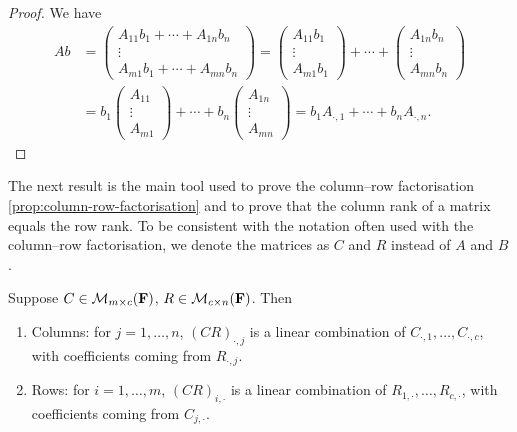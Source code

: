 \begin{proof}
We have
\begin{align*}
Ab&=\begin{pmatrix}
A_{11}b_1+\cdots+A_{1n}b_n\\
\vdots\\
A_{m1}b_1+\cdots+A_{mn}b_n
\end{pmatrix}
=\begin{pmatrix}
A_{11}b_1\\\vdots\\A_{m1}b_1
\end{pmatrix}+\cdots+\begin{pmatrix}
A_{1n}b_n\\\vdots\\A_{mn}b_n
\end{pmatrix}\\
&=b_1\begin{pmatrix}
A_{11}\\\vdots\\A_{m1}
\end{pmatrix}+\cdots+b_n\begin{pmatrix}
A_{1n}\\\vdots\\A_{mn}
\end{pmatrix}
=b_1A_{\cdot,1}+\cdots+b_nA_{\cdot,n}.
\end{align*}
\end{proof}

The next result is the main tool used to prove the column--row factorisation \ref{prop:column-row-factorisation} and to prove that the column rank of a matrix equals the row rank. 
To be consistent with the notation often used with the column--row factorisation, we denote the matrices as $C$ and $R$ instead of $A$ and $B$.

\begin{lemma}\label{lemma:matrix-multiplication-linear combinations-of-columns-or-rows}
Suppose $C\in\mathcal{M}_{m\times c}(\mathbf F)$, $R\in\mathcal{M}_{c\times n}(\mathbf F)$. Then
\begin{enumerate}[label=(\roman*)]
\item Columns: for $j=1,\dots,n$, $(CR)_{\cdot,j}$ is a linear combination of $C_{\cdot,1},\dots,C_{\cdot,c}$, with coefficients coming from $R_{\cdot,j}$.
\item Rows: for $i=1,\dots,m$, $(CR)_{i,\cdot}$ is a linear combination of $R_{1,\cdot},\dots,R_{c,\cdot}$, with coefficients coming from $C_{j,\cdot}$.
\end{enumerate}
\end{lemma}

